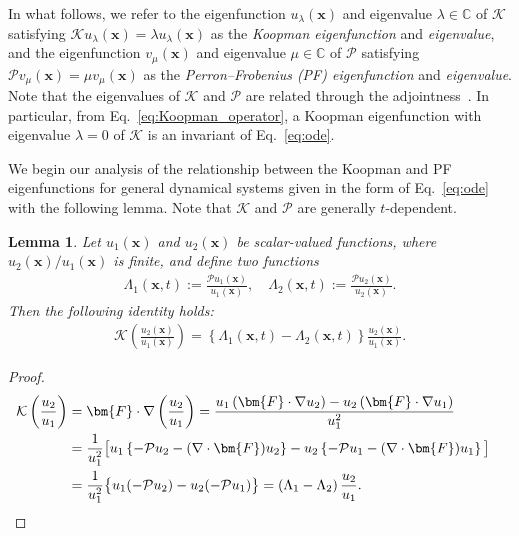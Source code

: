 \documentclass[
amsmath,amssymb,
]{revtex4-2}
\newtheorem{lemma}{Lemma}
\begin{document}
In what follows, we refer to the eigenfunction $u_\lambda(\bm{x})$ and eigenvalue $\lambda \in \mathbb{C}$ of $\mathcal{K}$ satisfying $\mathcal{K} u_\lambda(\bm{x}) = \lambda u_\lambda(\bm{x})$ as the \textit{Koopman eigenfunction} and \textit{eigenvalue}, and the eigenfunction $v_\mu(\bm{x})$ and eigenvalue $\mu \in \mathbb{C}$ of $\mathcal{P}$ satisfying $\mathcal{P} v_\mu(\bm{x}) = \mu v_\mu(\bm{x})$ as the \textit{Perron--Frobenius (PF) eigenfunction} and \textit{eigenvalue}. 
Note that the eigenvalues of $\mathcal{K}$ and $\mathcal{P}$ are related through the adjointness~\cite{brunton2022modern}.
%
In particular, from Eq.~\eqref{eq:Koopman_operator}, a Koopman eigenfunction with eigenvalue $\lambda = 0$ of $\mathcal{K}$ is an invariant of Eq.~\eqref{eq:ode}.

We begin our analysis of the relationship between the Koopman and PF eigenfunctions for general dynamical systems given in the form of Eq.~\eqref{eq:ode} with the following lemma.
%
Note that $\mathcal{K}$ and $\mathcal{P}$ are generally $t$-dependent.
%
\begin{lemma}
    \label{lem:1}
    Let $u_1(\bm{x})$ and 
    $u_2(\bm{x})$ be scalar-valued functions, where 
    $u_2({\bm x}) / u_1({\bm x})$ is finite, and define two functions
    \begin{align}
    \Lambda_1(\bm{x}, t) := \frac{\mathcal{P}u_1(\bm{x})}{u_1(\bm{x})}, \quad \Lambda_2(\bm{x},t) := \frac{\mathcal{P}u_2(\bm{x})}{u_2(\bm{x})}.
    \end{align}
    Then the following identity holds: 
    \begin{align}
        \mathcal{K} \left( \frac{u_2(\bm{x})}{u_1(\bm{x})} \right) = \left\{ \Lambda_1(\bm{x},t) - \Lambda_2(\bm{x},t) \right\} \frac{u_2(\bm{x})}{u_1(\bm{x})}.
    \end{align}
\end{lemma}
\begin{proof} 
   \begin{align}
    \mathcal{K} \left( \frac{u_2}{u_1} \right)
    &= \bm{F}
    \cdot \nabla \left( \frac{u_2}{u_1} \right)  
    = \frac{u_1 \left( \bm{F} \cdot \nabla u_2 \right) - u_2 \left( \bm{F} \cdot \nabla u_1 \right)}{u_1^2} \cr
    &= \frac{1}{ u_1^2} \big[ u_1 \left\{ -\mathcal{P} u_2 - (\nabla\cdot\bm{F})u_2  \right\}  - u_2 \left\{ -\mathcal{P} u_1 - (\nabla\cdot\bm{F})u_1 \right\} \big] \cr
   &= \frac{1}{u_1^2} \big\{ u_1 (-\mathcal{P} u_2) - u_2 (-\mathcal{P} u_1) \big\}      = (\Lambda_1  - \Lambda_2 )\, \frac{u_2}{u_1}.
\end{align} 
%
\end{proof}
\end{document}
